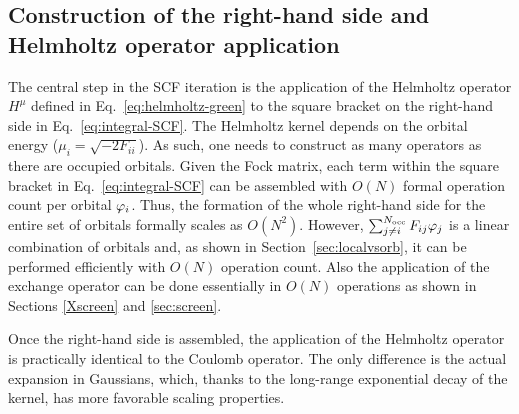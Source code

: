 \documentclass[journal=jctcce, manuscript=suppinfo]{achemso}
\begin{document}
\subsection{Construction of the right-hand side and Helmholtz operator application}\label{sec:rhs}
The central step in the SCF iteration is the application of the Helmholtz operator $H^{\mu}$ defined in Eq.~\eqref{eq:helmholtz-green} to the square bracket on the right-hand side in Eq.~\eqref{eq:integral-SCF}. The Helmholtz kernel depends on the orbital energy ($\mu_i = \sqrt{-2F_{ii}}$). As such, one needs to construct as many operators as there are occupied orbitals. Given the Fock matrix, each term within the square bracket in Eq.~\eqref{eq:integral-SCF} can be assembled with $O(N)$ formal operation count per orbital $\varphi_i$. Thus, the formation of the whole right-hand side for the entire set of orbitals formally scales as $O(N^{2})$. However, $\sum_{j \ne i}^{N_{\mathrm{occ}}} F_{ij} \varphi_j $ is a linear combination of orbitals and, as shown in Section~\ref{sec:localvsorb}, it can be performed efficiently with $O(N)$ operation count. Also the application of the exchange operator can be done essentially in $O(N)$ operations as shown in Sections \ref{Xscreen} and \ref{sec:screen}.

Once the right-hand side is assembled, the application of the Helmholtz operator is practically identical to the Coulomb operator. The only difference is the actual expansion in Gaussians, which, thanks to the long-range exponential decay of the kernel, has more favorable scaling properties.\cite{Frediani.10.1080/00268976.2013.810793} 


\end{document}
